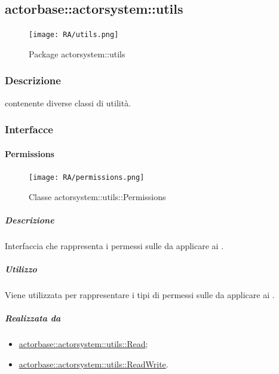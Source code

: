 \documentclass{scalatekids-article}
\begin{document}
\subsection{actorbase::actorsystem::utils}
\label{sec:actorbase::actorsystem::utils}

\begin{figure}[H]
  \begin{center}
    \texttt{[image: RA/utils.png]}
    \caption{Package actorsystem::utils}
  \end{center}
\end{figure}

\subsubsection{Descrizione}
 contenente diverse classi di utilità.

\subsubsection{Interfacce}

\paragraph{Permissions}
\label{sec:actorbase::actorsystem::utils::Permissions}

\begin{figure}[H]
  \begin{center}
    \texttt{[image: RA/permissions.png]}
    \caption{Classe actorsystem::utils::Permissions}
  \end{center}
\end{figure}

\subparagraph{Descrizione}

Interfaccia che rappresenta i permessi sulle  da applicare ai
.

\subparagraph{Utilizzo}

Viene utilizzata per rappresentare i tipi di permessi sulle 
da applicare ai .

\subparagraph{Realizzata da}

\begin{itemize}
\item \hyperref[sec:actorbase::actorsystem::utils::Read]{actorbase::actorsystem::utils::Read};
\item \hyperref[sec:actorbase::actorsystem::utils::ReadWrite]{actorbase::actorsystem::utils::ReadWrite}.
\end{itemize}
\end{document}
